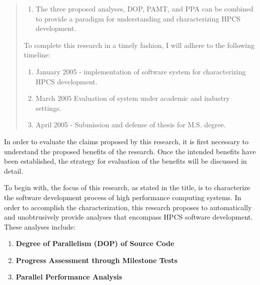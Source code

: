 \documentclass[11pt,twocolumn]{article}
\begin{document}
\begin{abstract}
\begin{enumerate}
\item
The three proposed analyses, DOP, PAMT, and PPA can be combined to
provide a paradigm for understanding and characterizing HPCS development.
\end{enumerate}

To complete this research in a timely fashion, I will adhere to the
following timeline: 
\begin{enumerate} 
  \item January 2005 - implementation of software system for
  characterizing HPCS development.  
  \item March 2005 Evaluation of system under academic and industry settings. 
  \item April 2005 - Submission and defense of thesis for M.S. degree.
\end{enumerate}


\end{abstract}


\label{sec:evaluation}
In order to evaluate the claims proposed by this research, it is first
necessary to understand the proposed benefits of the research.  Once
the intended benefits have been established, the strategy for
evaluation of the benefits will be discussed in detail.

To begin with, the focus of this research, as stated in the title, is
to characterize the software development process of high performance
computing systems.  In order to accomplish the characterization, this
research proposes to automatically and unobtrusively provide analyses
that encompass HPCS software development.  These analyses include:

\begin{enumerate}
\item {\bf Degree of Parallelism (DOP) of Source Code}
\item {\bf Progress Assessment through Milestone Tests}
\item {\bf Parallel Performance Analysis}
\end{enumerate}
\end{document}

